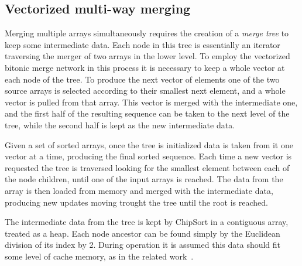 \documentclass{juliacon}
\begin{document}
\subsection{Vectorized multi-way merging}
%
Merging multiple arrays simultaneously requires the creation of a {\em merge tree} to keep some intermediate data. Each node in this tree is essentially an iterator traversing the merger of two arrays in the lower level. To employ the vectorized bitonic merge network in this process it is necessary to keep a whole vector at each node of the tree. To produce the next vector of elements one of the two source arrays is selected according to their smallest next element, and a whole vector is pulled from that array. This vector is merged with the intermediate one, and the first half of the resulting sequence can be taken to the next level of the tree, while the second half is kept as the new intermediate data.

Given a set of sorted arrays, once the tree is initialized data is taken from it one vector at a time, producing the final sorted sequence. Each time a new vector is requested the tree is traversed looking for the smallest element between each of the node children, until one of the input arrays is reached. The data from the array is then loaded from memory and merged with the intermediate data, producing new updates moving trought the tree until the root is reached.

The intermediate data from the tree is kept by ChipSort in a contiguous array, treated as a heap. Each node ancestor can be found simply by the Euclidean division of its index by 2. During operation it is assumed this data should fit some level of cache memory, as in the related work~\cite{DBLP:conf/IEEEpact/InoueMKN07,DBLP:journals/pvldb/ChhuganiNLMHCBKD08,DBLP:journals/pvldb/InoueT15}.
\end{document}
